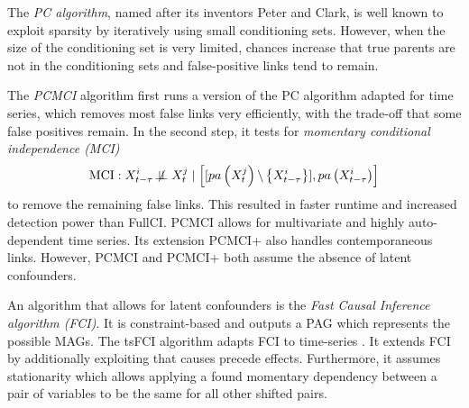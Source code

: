 \documentclass[conference]{IEEEtran}
\begin{document}
The \textit{PC algorithm}, named after its inventors Peter and Clark, is well known to exploit sparsity by iteratively using small conditioning sets\cite{runge_pcmci_2019}. However, when the size of the conditioning set is very limited, chances increase that true parents are not in the conditioning sets and false-positive links tend to remain\cite{runge_pcmci_2019}.

The \textit{PCMCI} algorithm first runs a version of the PC algorithm adapted for time series, which removes most false links very efficiently, with the trade-off that some false positives remain\cite{runge_pcmci_2019}. In the second step, it tests for \textit{momentary conditional independence (MCI)}
\begin{equation}
\mathrm{MCI}: X_{t-\tau}^{i} \not\!\perp\!\!\!\perp X_{t}^{j} \mid \left[[{pa}\left(X_{t}^{j}\right) \backslash\left\{X_{t-\tau}^{i}\right\}], {pa}\left(X_{t-\tau}^{i}\right)\right]
\end{equation}
to remove the remaining false links\cite{runge_pcmci_2019}.
This resulted in faster runtime and increased detection power than FullCI\cite{runge_pcmci_2019}.
PCMCI allows for multivariate and highly auto-dependent time series. Its extension PCMCI+ also handles contemporaneous links. However, PCMCI and PCMCI+ both assume the absence of latent confounders.

An algorithm that allows for latent confounders is the \textit{Fast Causal Inference algorithm (FCI)}\cite{spirtes_causation_2000}. It is constraint-based and outputs a PAG which represents the possible MAGs.
The tsFCI algorithm adapts FCI to time-series \cite{entner_causal_2010}. It extends FCI by additionally exploiting that causes precede effects. Furthermore, it assumes stationarity which allows applying a found momentary dependency between a pair of variables to be the same for all other shifted pairs.
\end{document}
